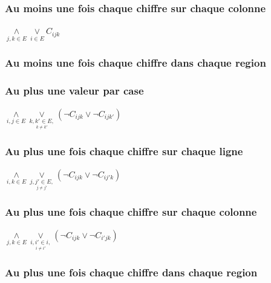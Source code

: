 \documentclass[12pt]{report}
\begin{document}
\subsubsection*{Au moins une fois chaque chiffre sur chaque colonne}
$\underset{j,k \in E}{\land} \underset{i \in E}{\lor} C_{ijk}$
\subsubsection*{Au moins une fois chaque chiffre dans chaque region}
\subsubsection*{Au plus une valeur par case}
$\underset{i,j \in E}{\land} \underset{\underset{k \ne k\prime}{k,k\prime \in E,} }{\lor} (\lnot C_{ijk} \lor \lnot C_{ijk\prime})$
\subsubsection*{Au plus une fois chaque chiffre sur chaque ligne}
$\underset{i,k \in E}{\land} \underset{\underset{j \ne j\prime}{j,j\prime \in E,}}{\lor} (\lnot C_{ijk} \lor \lnot C_{ij\prime k})$
\subsubsection*{Au plus une fois chaque chiffre sur chaque colonne}
$\underset{j,k \in E}{\land} \underset{\underset{i \ne i\prime}{i,i\prime \in i,}}{\lor} (\lnot C_{ijk} \lor \lnot C_{i\prime jk})$
\subsubsection*{Au plus une fois chaque chiffre dans chaque region}
\end{document}

